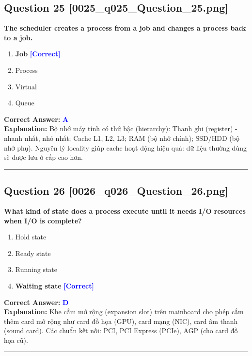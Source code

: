 \documentclass[11pt,a4paper]{article}
\begin{document}
\begin{minipage}{\textwidth}
\subsection*{Question 25 \quad \footnotesize{[0025\_q025\_Question\_25.png]}}
\noindent \textbf{The scheduler creates a process from a job and changes a process back to a job.}

\begin{enumerate}[label=\Alph*.]
    \item \textbf{Job} \hfill \textcolor{blue}{\textbf{[Correct]}}
    \item Process
    \item Virtual
    \item Queue
\end{enumerate}

\noindent \textbf{Correct Answer:} \textcolor{blue}{\textbf{A}} \\[2pt]
\noindent \textbf{Explanation:} Bộ nhớ máy tính có thứ bậc (hierarchy): Thanh ghi (register) - nhanh nhất, nhỏ nhất; Cache L1, L2, L3; RAM (bộ nhớ chính); SSD/HDD (bộ nhớ phụ). Nguyên lý locality giúp cache hoạt động hiệu quả: dữ liệu thường dùng sẽ được lưu ở cấp cao hơn.

\par\vspace{0.3cm}
\hrule
\vspace{0.3cm}
\end{minipage}

\begin{minipage}{\textwidth}
\subsection*{Question 26 \quad \footnotesize{[0026\_q026\_Question\_26.png]}}
\noindent \textbf{What kind of state does a process execute until it needs I/O resources when I/O is complete?}

\begin{enumerate}[label=\Alph*.]
    \item Hold state
    \item Ready state
    \item Running state
    \item \textbf{Waiting state} \hfill \textcolor{blue}{\textbf{[Correct]}}
\end{enumerate}

\noindent \textbf{Correct Answer:} \textcolor{blue}{\textbf{D}} \\[2pt]
\noindent \textbf{Explanation:} Khe cắm mở rộng (expansion slot) trên mainboard cho phép cắm thêm card mở rộng như card đồ họa (GPU), card mạng (NIC), card âm thanh (sound card). Các chuẩn kết nối: PCI, PCI Express (PCIe), AGP (cho card đồ họa cũ).

\par\vspace{0.3cm}
\hrule
\vspace{0.3cm}
\end{minipage}
\end{document}
